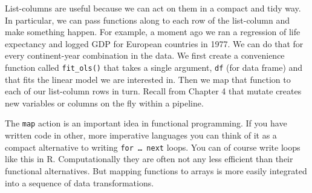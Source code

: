 \documentclass[]{book}
\newenvironment{Shaded}{\begin{snugshade}}{\end{snugshade}}
\newcommand{\CommentTok}[1]{\textcolor[rgb]{0.56,0.35,0.01}{\textit{#1}}}
\newcommand{\ControlFlowTok}[1]{\textcolor[rgb]{0.13,0.29,0.53}{\textbf{#1}}}
\newcommand{\DataTypeTok}[1]{\textcolor[rgb]{0.13,0.29,0.53}{#1}}
\newcommand{\KeywordTok}[1]{\textcolor[rgb]{0.13,0.29,0.53}{\textbf{#1}}}
\newcommand{\NormalTok}[1]{#1}
\newcommand{\OperatorTok}[1]{\textcolor[rgb]{0.81,0.36,0.00}{\textbf{#1}}}
\newcommand{\StringTok}[1]{\textcolor[rgb]{0.31,0.60,0.02}{#1}}
\begin{document}
List-columns are useful because we can act on them in a compact and tidy way. In particular, we can pass functions along to each row of the list-column and make something happen. For example, a moment ago we ran a regression of life expectancy and logged GDP for European countries in 1977. We can do that for every continent-year combination in the data. We first create a convenience function called \texttt{fit\_ols()} that takes a single argument, \texttt{df} (for data frame) and that fits the linear model we are interested in. Then we map that function to each of our list-column rows in turn. Recall from Chapter 4 that mutate creates new variables or columns on the fly within a pipeline.

The \texttt{map} action is an important idea in functional programming. If you have written code in other, more imperative languages you can think of it as a compact alternative to writing \texttt{for\ \ldots{}\ next} loops. You can of course write loops like this in R. Computationally they are often not any less efficient than their functional alternatives. But mapping functions to arrays is more easily integrated into a sequence of data transformations.

\begin{Shaded}
\end{Shaded}
\end{document}
